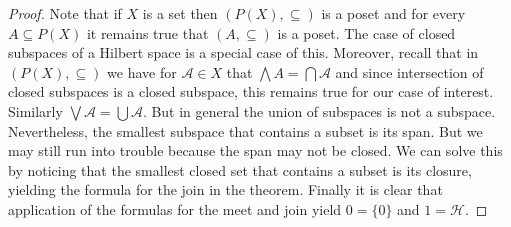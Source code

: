 \begin{proof}
Note that if $X$ is a set then $(P(X),\subseteq)$ is a poset and for every $A\subseteq P(X)$ it remains true that $(A,\subseteq)$ is a poset. The case of closed subspaces of a Hilbert space is a special case of this. Moreover, recall that in $(P(X),\subseteq)$ we have for $\mathcal{A}\in X$ that $\bigwedge A = \bigcap \mathcal{A}$ and since intersection of closed subspaces is a closed subspace, this remains true for our case of interest. Similarly $\bigvee\mathcal{A}=\bigcup\mathcal{A}$. But in general the union of subspaces is not a subspace. Nevertheless, the smallest subspace that contains a subset is its span. But we may still run into trouble because the span may not be closed. We can solve this by noticing that the smallest closed set that contains a subset is its closure, yielding the formula for the join in the theorem. Finally it is clear that application of the formulas for the meet and join yield $0=\{0\}$ and $1=\mathcal{H}$. 
\end{proof}

